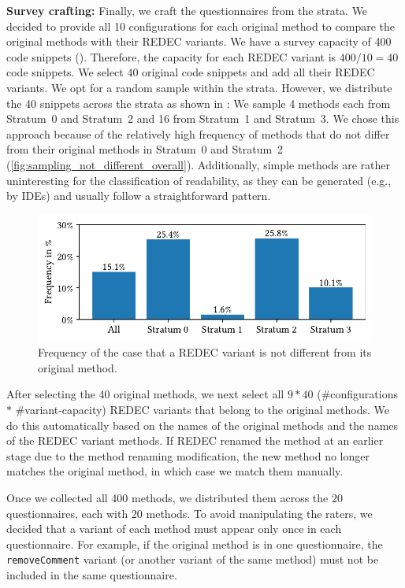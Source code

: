 \documentclass[%
class=scrreprt,
chapterprefix=false,%
open=right,%
twoside=true,%
paper=a4,%
logofile={Logo\_zentral\_farbig\_EN.png},%
thesistype=master,%
UKenglish,%
]{se2thesis}
\theoremstyle{definition}
\newcommand{\mod}{modification\xspace}
\newcommand{\rdh}{REDEC\xspace}
\begin{document}
	\textbf{Survey crafting:} Finally, we craft the questionnaires from the strata. We decided to provide all 10 configurations for each original method to compare the original methods with their \rdh variants. We have a survey capacity of 400 code snippets (). Therefore, the capacity for each \rdh variant is $400/10 = 40$ code snippets. We select 40 original code snippets and add all their \rdh variants.
    We opt for a random sample within the strata. However, we distribute the 40 snippets across the strata as shown in :
    We sample 4 methods each from Stratum~0 and Stratum~2 and 16 from Stratum~1 and Stratum~3.
    We chose this approach because of the relatively high frequency of methods that do not differ from their original methods in Stratum~0 and Stratum~2 (\autoref{fig:sampling_not_different_overall}). Additionally, simple methods are rather uninteresting for the classification of readability, as they can be generated (e.g., by IDEs) and usually follow a straightforward pattern.
	
	\begin{figure}[tb]
		\centering
		\includegraphics[width=\textwidth]{img/sampling_not_different_overall_ylim.pdf}
		\caption{Frequency of the case that a \rdh variant is not different from its original method.} 
		\label{fig:sampling_not_different_overall}
	\end{figure}
		
	After selecting the 40 original methods, we next select all $9*40$ (\#configurations $*$ \#variant-capacity) \rdh variants that belong to the original methods. We do this automatically based on the names of the original methods and the names of the \rdh variant methods. If \rdh renamed the method at an earlier stage due to the method renaming \mod, the new method no longer matches the original method, in which case we match them manually.
		
    Once we collected all 400 methods, we distributed them across the 20 questionnaires, each with 20 methods. To avoid manipulating the raters, we decided that a variant of each method must appear only once in each questionnaire. For example, if the original method is in one questionnaire, the \texttt{removeComment} variant (or another variant of the same method) must not be included in the same questionnaire.
		
\end{document}
